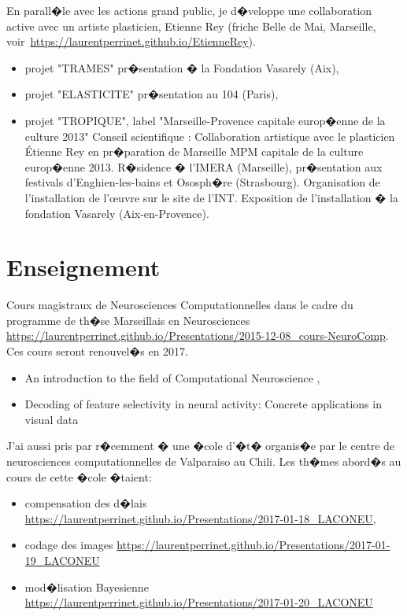 En parall�le avec les actions grand public, je d�veloppe une collaboration active avec un artiste plasticien, Etienne Rey (friche Belle de Mai, Marseille, voir~\url{https://laurentperrinet.github.io/EtienneRey}).

\begin{itemize}
	\item projet "TRAMES" pr�sentation � la Fondation Vasarely (Aix),
	\item projet "ELASTICITE" pr�sentation au 104 (Paris),
	\item projet "TROPIQUE", label "Marseille-Provence capitale europ�enne de la culture 2013" Conseil scientifique : Collaboration artistique avec le plasticien \'Etienne Rey en pr�paration de Marseille MPM capitale de la culture europ�enne 2013. R�sidence � l'IMERA (Marseille), pr�sentation aux festivals d'Enghien-les-bains et Ososph�re (Strasbourg). Organisation de l'installation de l'\oe uvre sur le site de l'INT. Exposition de l'installation � la fondation Vasarely (Aix-en-Provence).
\end{itemize}


\section{Enseignement} %

Cours magistraux de Neurosciences Computationnelles  dans le cadre du programme de th�se Marseillais en Neurosciences \url{https://laurentperrinet.github.io/Presentations/2015-12-08_cours-NeuroComp}. Ces cours seront renouvel�s en 2017.

\begin{itemize}
	\item An introduction to the field of Computational Neuroscience ,
	\item Decoding of feature selectivity in neural activity: Concrete applications in visual data
\end{itemize}


J'ai aussi pris par r�cemment � une �cole d'�t� organis�e par le centre de neurosciences computationnelles de Valparaiso au Chili. Les th�mes abord�s au cours de cette �cole �taient:
\begin{itemize}
	\item compensation des d�lais \url{https://laurentperrinet.github.io/Presentations/2017-01-18_LACONEU},
	\item codage des images \url{https://laurentperrinet.github.io/Presentations/2017-01-19_LACONEU}
	\item mod�lisation Bayesienne \url{https://laurentperrinet.github.io/Presentations/2017-01-20_LACONEU}

\end{itemize}

